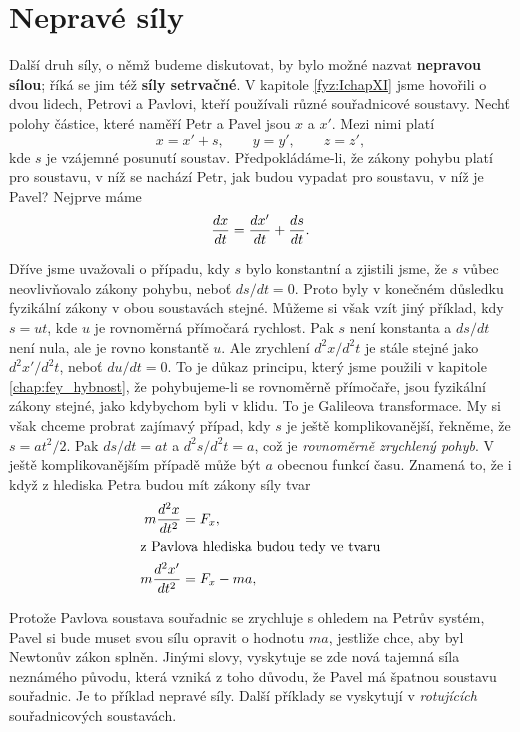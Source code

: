  \section{Nepravé síly}\label{fyz:IchapXIIsecVI}
    Další druh síly, o němž budeme diskutovat, by bylo možné nazvat \textbf{nepravou sílou}; říká 
    se jim též \textbf{síly setrvačné}. V kapitole \ref{fyz:IchapXI} jsme hovořili o dvou 
    lidech, Petrovi a Pavlovi, kteří používali různé souřadnicové soustavy. Nechť polohy částice, 
    které naměří Petr a Pavel jsou \(x\) a \(x'\). Mezi nimi platí
    \begin{equation}\label{FYZ:eq0178}
      x = x' + s, \qquad y=y', \qquad z=z',
    \end{equation}
    kde \(s\) je vzájemné posunutí soustav. Předpokládáme-li, že zákony pohybu platí pro soustavu, 
    v níž se nachází Petr, jak budou vypadat pro soustavu, v níž je Pavel? Nejprve máme
    \begin{equation}\label{FYZ:eq0179}
      \dfrac{d x}{d t} = \dfrac{d x'}{d t} + \dfrac{d s}{d t}.
    \end{equation}
    
    Dříve jsme uvažovali o případu, kdy \(s\) bylo konstantní a zjistili jsme, že \(s\) vůbec 
    neovlivňovalo zákony pohybu, neboť \(ds/dt = 0\). Proto byly v konečném důsledku fyzikální 
    zákony v obou soustavách stejné. Můžeme si však vzít jiný příklad, kdy \(s=ut\), kde \(u\) je 
    rovnoměrná přímočará rychlost. Pak \(s\) není konstanta a \(ds/dt\) není nula, ale je rovno 
    konstantě \(u\). Ale zrychlení \(d^2x/d^2t\) je stále stejné jako \(d^2x'/d^2t\), neboť 
    \(du/dt=0\). To je důkaz principu, který jsme použili v kapitole \ref{chap:fey_hybnost}, že 
    pohybujeme-li se rovnoměrně přímočaře, jsou fyzikální zákony stejné, jako kdybychom byli v 
    klidu. To je Galileova transformace. My si však chceme probrat zajímavý případ, kdy \(s\) je 
    ještě komplikovanější, řekněme, že \(s=at^2/2\). Pak \(ds/dt=at\) a \(d^2s/d^2t = a\), což je 
    \emph{rovnoměrně zrychlený pohyb}. V ještě komplikovanějším případě může být \(a\) obecnou 
    funkcí času. Znamená to, že i když z hlediska Petra budou mít zákony síly tvar
    \begin{align}
      m\dfrac{d^2 x}{d t^2}  &= F_x,        \label{FYZ:eq0180} \\
      \shortintertext{z Pavlova hlediska budou tedy ve tvaru} 
      m\dfrac{d^2 x'}{d t^2} &= F_x - ma,   \label{FYZ:eq0181}
    \end{align}
    
    Protože Pavlova soustava souřadnic se zrychluje s ohledem na Petrův systém, Pavel si bude muset 
    svou sílu opravit o hodnotu \(ma\), jestliže chce, aby byl Newtonův zákon splněn. Jinými slovy, 
    vyskytuje se zde nová tajemná síla neznámého původu, která vzniká z toho důvodu, že Pavel má 
    špatnou soustavu souřadnic. Je to příklad nepravé síly. Další příklady se vyskytují v 
    \emph{rotujících} souřadnicových soustavách.
    
